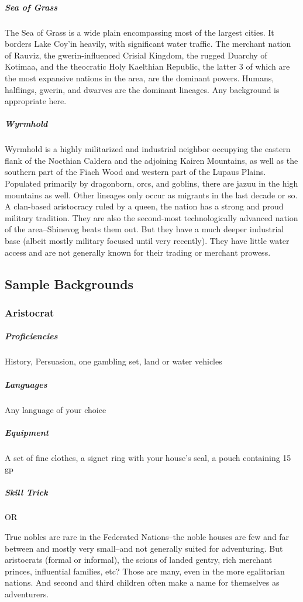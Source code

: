 \documentclass[draft]{article}
\newcommand*{\BackgroundBlock}[4]{%
	\subparagraph*{Proficiencies} #1
	\subparagraph*{Languages} #2
	\subparagraph*{Equipment} #3
	\subparagraph*{Skill Trick} #4
}
\begin{document}
\subparagraph*{Sea of Grass}
The Sea of Grass is a wide plain encompassing most of the largest cities. It borders Lake Coy'in heavily, with significant water traffic. The merchant nation of Rauviz, the gwerin-influenced Crisial Kingdom, the rugged Duarchy of Kotimaa, and the theocratic Holy Kaelthian Republic, the latter 3 of which are the most expansive nations in the area, are the dominant powers. Humans, halflings, gwerin, and dwarves are the dominant lineages. Any background is appropriate here.

\subparagraph*{Wyrmhold}
Wyrmhold is a highly militarized and industrial neighbor occupying the eastern flank of the Nocthian Caldera and the adjoining Kairen Mountains, as well as the southern part of the Fiach Wood and western part of the Lupaus Plains. Populated primarily by dragonborn, orcs, and goblins, there are jazuu in the high mountains as well. Other lineages only occur as migrants in the last decade or so. A clan-based aristocracy ruled by a queen, the nation has a strong and proud military tradition. They are also the second-most technologically advanced nation of the area--Shinevog beats them out. But they have a much deeper industrial base (albeit mostly military focused until very recently). They have little water access and are not generally known for their trading or merchant prowess.

\subsection{Sample Backgrounds}
\subsubsection{Aristocrat}
\BackgroundBlock{History, Persuasion, one gambling set, land or water vehicles}{Any language of your choice}{A set of fine clothes, a signet ring with your house's seal, a pouch containing 15 gp}{\nameref{st:scholar-history} OR \nameref{st:diplomat}}

True nobles are rare in the Federated Nations--the noble houses are few and far between and mostly very small--and not generally suited for adventuring. But aristocrats (formal or informal), the scions of landed gentry, rich merchant princes, influential families, etc? Those are many, even in the more egalitarian nations. And second and third children often make a name for themselves as adventurers.
\end{document}
